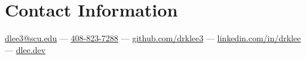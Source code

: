 \section{\sc Contact Information}
\href{mailto:dlee3@scu.edu}{dlee3@scu.edu} ---
\href{tel:408-823-7288}{408-823-7288} ---
\href{https://github.com/drklee3}{github.com/drklee3} ---
\href{https://www.linkedin.com/in/drklee/}{linkedin.com/in/drklee} ---
\href{https://dlee.dev}{dlee.dev}


